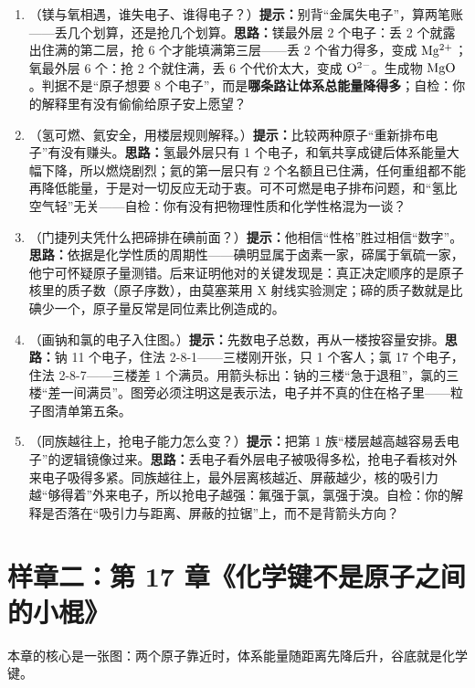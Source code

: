 \begin{enumerate}[itemsep=3pt]
\item （镁与氧相遇，谁失电子、谁得电子？）\textbf{提示：}别背“金属失电子”，算两笔账——丢几个划算，还是抢几个划算。\textbf{思路：}镁最外层 2 个电子：丢 2 个就露出住满的第二层，抢 6 个才能填满第三层——丢 2 个省力得多，变成 $\mathrm{Mg^{2+}}$；氧最外层 6 个：抢 2 个就住满，丢 6 个代价太大，变成 $\mathrm{O^{2-}}$。生成物 $\mathrm{MgO}$。判据不是“原子想要 8 个电子”，而是\textbf{哪条路让体系总能量降得多}；自检：你的解释里有没有偷偷给原子安上愿望？
\item （氢可燃、氦安全，用楼层规则解释。）\textbf{提示：}比较两种原子“重新排布电子”有没有赚头。\textbf{思路：}氢最外层只有 1 个电子，和氧共享成键后体系能量大幅下降，所以燃烧剧烈；氦的第一层只有 2 个名额且已住满，任何重组都不能再降低能量，于是对一切反应无动于衷。可不可燃是电子排布问题，和“氢比空气轻”无关——自检：你有没有把物理性质和化学性格混为一谈？
\item （门捷列夫凭什么把碲排在碘前面？）\textbf{提示：}他相信“性格”胜过相信“数字”。\textbf{思路：}依据是化学性质的周期性——碘明显属于卤素一家，碲属于氧硫一家，他宁可怀疑原子量测错。后来证明他对的关键发现是：真正决定顺序的是原子核里的质子数（原子序数），由莫塞莱用 X 射线实验测定；碲的质子数就是比碘少一个，原子量反常是同位素比例造成的。
\item （画钠和氯的电子入住图。）\textbf{提示：}先数电子总数，再从一楼按容量安排。\textbf{思路：}钠 11 个电子，住法 2-8-1——三楼刚开张，只 1 个客人；氯 17 个电子，住法 2-8-7——三楼差 1 个满员。用箭头标出：钠的三楼“急于退租”，氯的三楼“差一间满员”。图旁必须注明这是表示法，电子并不真的住在格子里——粒子图清单第五条。
\item （同族越往上，抢电子能力怎么变？）\textbf{提示：}把第 1 族“楼层越高越容易丢电子”的逻辑镜像过来。\textbf{思路：}丢电子看外层电子被吸得多松，抢电子看核对外来电子吸得多紧。同族越往上，最外层离核越近、屏蔽越少，核的吸引力越“够得着”外来电子，所以抢电子越强：氟强于氯，氯强于溴。自检：你的解释是否落在“吸引力与距离、屏蔽的拉锯”上，而不是背箭头方向？
\end{enumerate}

\section{样章二：第 17 章《化学键不是原子之间的小棍》}

本章的核心是一张图：两个原子靠近时，体系能量随距离先降后升，谷底就是化学键。

